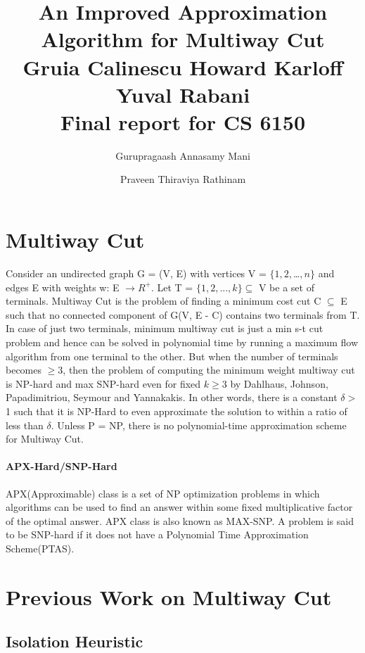 \documentclass[11pt]{article}
\title{An Improved Approximation Algorithm for Multiway Cut\\Gruia Calinescu Howard Karloﬀ Yuval Rabani\\Final report for CS 6150}
\author{Gurupragaash Annasamy Mani \and Praveen Thiraviya Rathinam}
\begin{document}
\maketitle

\section{Multiway Cut}

Consider an undirected graph G = (V, E) with vertices V = $\{1, 2, $\dots$, n\}$ and edges E with weights w: E $\rightarrow R^{+}$. Let T = $\{1, 2, . . . , k\} \subseteq$ V be a set of terminals. Multiway Cut is the problem of finding a minimum cost cut C $\subseteq$ E such that no connected component of G(V, E - C) contains two terminals from T. In case of just two terminals, minimum multiway cut is just a min s-t cut problem and hence can be solved in polynomial time by running a maximum flow algorithm from one terminal to the other. But when the number of terminals becomes $\ge 3$, then the problem of computing the minimum weight multiway cut is NP-hard and max SNP-hard even for fixed $k \ge 3$ by Dahlhaus, Johnson, Papadimitriou, Seymour and Yannakakis. In other words, there is a constant $\delta >$ 1 such that it is NP-Hard to even approximate the solution to within a ratio of less than $\delta$. Unless P = NP, there is no polynomial-time approximation scheme for Multiway Cut.
\paragraph{APX-Hard/SNP-Hard}
APX(Approximable) class is a set of NP optimization problems in which algorithms can be used to find an answer within some fixed multiplicative factor of the optimal answer. APX class is also known as MAX-SNP. A problem is said to be SNP-hard if it does not have a Polynomial Time Approximation Scheme(PTAS).
 
\section{Previous Work on Multiway Cut} 
\subsection{Isolation Heuristic}
\end{document}
